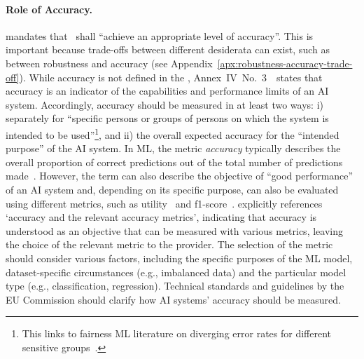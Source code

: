 \paragraph{Role of Accuracy.}
 mandates that \HRAIS\ shall ``achieve an
appropriate level of accuracy''.
%
This is important because trade-offs between different desiderata can exist, such as between robustness and accuracy (see Appendix~\ref{apx:robustness-accuracy-trade-off}).
% 
While accuracy is not defined in the \EUAIAct, Annex~IV~No.~3~\EUAIAct\ states that accuracy is an indicator of the capabilities and performance limits of an AI system.
% 
Accordingly,  accuracy should be measured in at least two ways:
i) separately for ``specific persons or groups of persons on which the system is intended to be used''\footnote{This links to fairness ML literature on diverging error rates for different sensitive groups~\cite{mitchell2021algorithmic, chouldechova2017fairer}.}, and
%
ii) the overall expected accuracy for the ``intended purpose'' of the AI system. 
%
In ML, the metric \emph{accuracy} typically describes the overall proportion of correct predictions out of the total number of predictions made~\cite{carvalho2019machine}. 
%
However, the term can also describe the objective of ``good performance'' of an AI system and, depending on its specific purpose, can also be evaluated using different metrics, such as utility~\cite{corbett2017algorithmic} and f1-score~\cite{sokolova2006beyond}. 
% 
 explicitly references  `accuracy and the relevant accuracy metrics', indicating that accuracy is understood as an objective that can be measured with various metrics, leaving the choice of the relevant metric to the provider.
% 
The selection of the metric should consider various factors, including the specific purposes of the ML model, dataset-specific circumstances (e.g., imbalanced data) and the particular model type (e.g., classification, regression). Technical standards and guidelines by the EU Commission should clarify how AI systems' accuracy should be measured.



